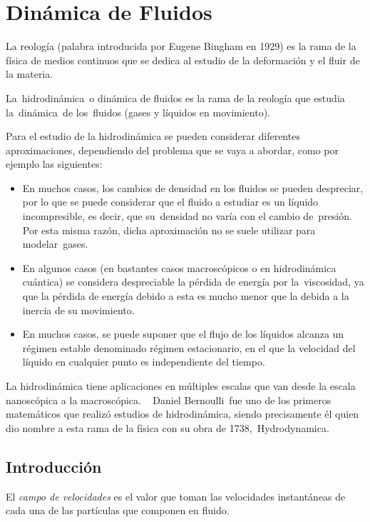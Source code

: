 \chapter{Dinámica de Fluidos}

\begin{miparrafo}
La reología (palabra introducida por Eugene Bingham en 1929) es la rama de la física de medios continuos que se dedica al estudio de la deformación y el fluir de la materia.

La hidrodinámica o dinámica de fluidos es la rama de la reología que estudia la dinámica de los fluidos (gases y líquidos en movimiento).

Para el estudio de la hidrodinámica se pueden considerar diferentes aproximaciones, dependiendo del problema que se vaya a abordar, como por ejemplo las siguientes: 

\begin{itemize}
\item En muchos casos, los cambios de densidad en los fluidos se pueden despreciar, por lo que se puede considerar que el fluido a estudiar es un líquido incompresible, es decir, que su densidad no varía con el cambio de presión. Por esta misma razón, dicha aproximación no se suele utilizar para modelar gases.
\item En algunos casos (en bastantes casos macroscópicos o en hidrodinámica cuántica) se considera despreciable la pérdida de energía por la viscosidad, ya que la pérdida de energía debido a esta es mucho menor que la debida a la inercia de su movimiento.
\item En muchos casos, se puede suponer que el flujo de los líquidos alcanza un régimen estable denominado régimen estacionario, en el que la velocidad del líquido en cualquier punto es independiente del tiempo.
\end{itemize}
La hidrodinámica tiene aplicaciones en múltiples escalas que van desde la escala nanoscópica a la macroscópica.
 
Daniel Bernoulli fue uno de los primeros matemáticos que realizó estudios de hidrodinámica, siendo precisamente él quien dio nombre a esta rama de la física con su obra de 1738, Hydrodynamica.	
\end{miparrafo}

\section{Introducción}
El \emph{campo de velocidades} es el valor que toman las velocidades instantáneas de cada una de las partículas que componen en fluido. 

